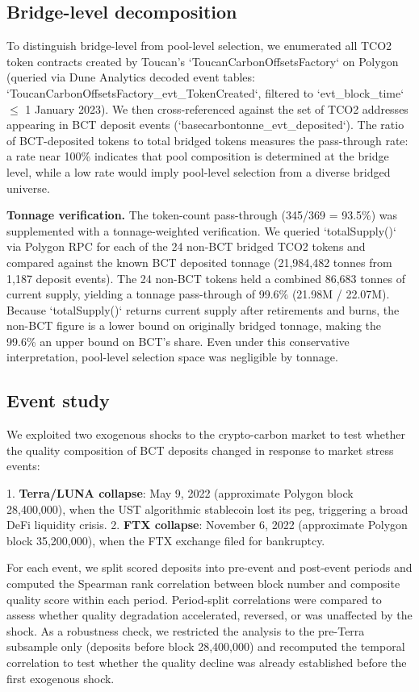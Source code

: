 \documentclass[11pt]{article}
\begin{document}
\subsection*{Bridge-level decomposition}

To distinguish bridge-level from pool-level selection, we enumerated all TCO2 token contracts created by Toucan's `ToucanCarbonOffsetsFactory` on Polygon (queried via Dune Analytics decoded event tables: `ToucanCarbonOffsetsFactory\_evt\_TokenCreated`, filtered to `evt\_block\_time` $\leq$ 1 January 2023). We then cross-referenced against the set of TCO2 addresses appearing in BCT deposit events (`basecarbontonne\_evt\_deposited`). The ratio of BCT-deposited tokens to total bridged tokens measures the pass-through rate: a rate near 100\% indicates that pool composition is determined at the bridge level, while a low rate would imply pool-level selection from a diverse bridged universe.

\textbf{Tonnage verification.} The token-count pass-through (345/369 = 93.5\%) was supplemented with a tonnage-weighted verification. We queried `totalSupply()` via Polygon RPC for each of the 24 non-BCT bridged TCO2 tokens and compared against the known BCT deposited tonnage (21,984,482 tonnes from 1,187 deposit events). The 24 non-BCT tokens held a combined 86,683 tonnes of current supply, yielding a tonnage pass-through of 99.6\% (21.98M / 22.07M). Because `totalSupply()` returns current supply after retirements and burns, the non-BCT figure is a lower bound on originally bridged tonnage, making the 99.6\% an upper bound on BCT's share. Even under this conservative interpretation, pool-level selection space was negligible by tonnage.

\subsection*{Event study}

We exploited two exogenous shocks to the crypto-carbon market to test whether the quality composition of BCT deposits changed in response to market stress events:

1. \textbf{Terra/LUNA collapse}: May 9, 2022 (approximate Polygon block 28,400,000), when the UST algorithmic stablecoin lost its peg, triggering a broad DeFi liquidity crisis.
2. \textbf{FTX collapse}: November 6, 2022 (approximate Polygon block 35,200,000), when the FTX exchange filed for bankruptcy.

For each event, we split scored deposits into pre-event and post-event periods and computed the Spearman rank correlation between block number and composite quality score within each period. Period-split correlations were compared to assess whether quality degradation accelerated, reversed, or was unaffected by the shock. As a robustness check, we restricted the analysis to the pre-Terra subsample only (deposits before block 28,400,000) and recomputed the temporal correlation to test whether the quality decline was already established before the first exogenous shock.
\end{document}

